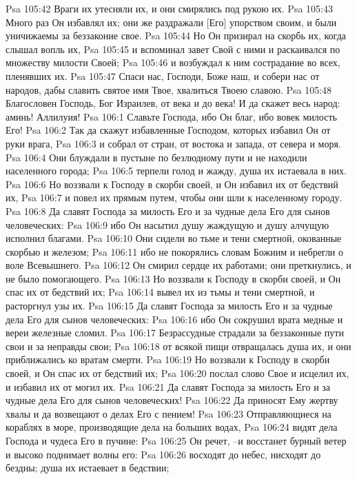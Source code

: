 Psa 105:42  Враги их утесняли их, и они смирялись под рукою их.
Psa 105:43  Много раз Он избавлял их; они же раздражали [Его] упорством своим, и были уничижаемы за беззаконие свое.
Psa 105:44  Но Он призирал на скорбь их, когда слышал вопль их,
Psa 105:45  и вспоминал завет Свой с ними и раскаивался по множеству милости Своей;
Psa 105:46  и возбуждал к ним сострадание во всех, пленявших их.
Psa 105:47  Спаси нас, Господи, Боже наш, и собери нас от народов, дабы славить святое имя Твое, хвалиться Твоею славою.
Psa 105:48  Благословен Господь, Бог Израилев, от века и до века! И да скажет весь народ: аминь! Аллилуия!
Psa 106:1  Славьте Господа, ибо Он благ, ибо вовек милость Его!
Psa 106:2  Так да скажут избавленные Господом, которых избавил Он от руки врага,
Psa 106:3  и собрал от стран, от востока и запада, от севера и моря.
Psa 106:4  Они блуждали в пустыне по безлюдному пути и не находили населенного города;
Psa 106:5  терпели голод и жажду, душа их истаевала в них.
Psa 106:6  Но воззвали к Господу в скорби своей, и Он избавил их от бедствий их,
Psa 106:7  и повел их прямым путем, чтобы они шли к населенному городу.
Psa 106:8  Да славят Господа за милость Его и за чудные дела Его для сынов человеческих:
Psa 106:9  ибо Он насытил душу жаждущую и душу алчущую исполнил благами.
Psa 106:10  Они сидели во тьме и тени смертной, окованные скорбью и железом;
Psa 106:11  ибо не покорялись словам Божиим и небрегли о воле Всевышнего.
Psa 106:12  Он смирил сердце их работами; они преткнулись, и не было помогающего.
Psa 106:13  Но воззвали к Господу в скорби своей, и Он спас их от бедствий их;
Psa 106:14  вывел их из тьмы и тени смертной, и расторгнул узы их.
Psa 106:15  Да славят Господа за милость Его и за чудные дела Его для сынов человеческих:
Psa 106:16  ибо Он сокрушил врата медные и вереи железные сломил.
Psa 106:17  Безрассудные страдали за беззаконные пути свои и за неправды свои;
Psa 106:18  от всякой пищи отвращалась душа их, и они приближались ко вратам смерти.
Psa 106:19  Но воззвали к Господу в скорби своей, и Он спас их от бедствий их;
Psa 106:20  послал слово Свое и исцелил их, и избавил их от могил их.
Psa 106:21  Да славят Господа за милость Его и за чудные дела Его для сынов человеческих!
Psa 106:22  Да приносят Ему жертву хвалы и да возвещают о делах Его с пением!
Psa 106:23  Отправляющиеся на кораблях в море, производящие дела на больших водах,
Psa 106:24  видят дела Господа и чудеса Его в пучине:
Psa 106:25  Он речет, --и восстанет бурный ветер и высоко поднимает волны его:
Psa 106:26  восходят до небес, нисходят до бездны; душа их истаевает в бедствии;
